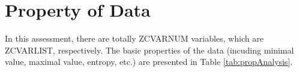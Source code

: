 \section{Property of Data}

In this assessment, there are totally ZCVARNUM variables, which are ZCVARLIST, respectively. 
The basic properties of the data (incuding minimal value, maximal value, entropy, etc.) are presented in Table \ref{tab:propAnalysis}. 




